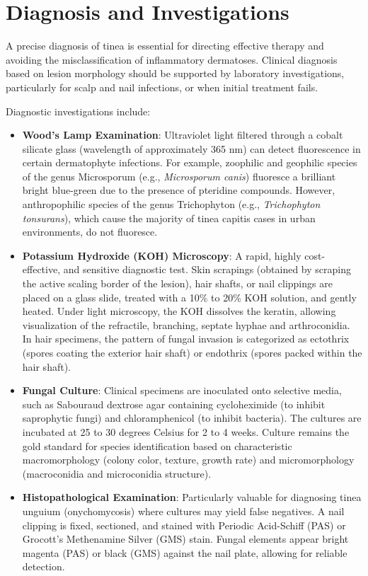 \section*{Diagnosis and Investigations}
A precise diagnosis of tinea is essential for directing effective therapy and avoiding the misclassification of inflammatory dermatoses. Clinical diagnosis based on lesion morphology should be supported by laboratory investigations, particularly for scalp and nail infections, or when initial treatment fails.

Diagnostic investigations include:
\begin{itemize}
    \item \textbf{Wood's Lamp Examination}: Ultraviolet light filtered through a cobalt silicate glass (wavelength of approximately 365 nm) can detect fluorescence in certain dermatophyte infections. For example, zoophilic and geophilic species of the genus Microsporum (e.g., \textit{Microsporum canis}) fluoresce a brilliant bright blue-green due to the presence of pteridine compounds. However, anthropophilic species of the genus Trichophyton (e.g., \textit{Trichophyton tonsurans}), which cause the majority of tinea capitis cases in urban environments, do not fluoresce.
    \item \textbf{Potassium Hydroxide (KOH) Microscopy}: A rapid, highly cost-effective, and sensitive diagnostic test. Skin scrapings (obtained by scraping the active scaling border of the lesion), hair shafts, or nail clippings are placed on a glass slide, treated with a 10\% to 20\% KOH solution, and gently heated. Under light microscopy, the KOH dissolves the keratin, allowing visualization of the refractile, branching, septate hyphae and arthroconidia. In hair specimens, the pattern of fungal invasion is categorized as ectothrix (spores coating the exterior hair shaft) or endothrix (spores packed within the hair shaft).
    \item \textbf{Fungal Culture}: Clinical specimens are inoculated onto selective media, such as Sabouraud dextrose agar containing cycloheximide (to inhibit saprophytic fungi) and chloramphenicol (to inhibit bacteria). The cultures are incubated at 25 to 30 degrees Celsius for 2 to 4 weeks. Culture remains the gold standard for species identification based on characteristic macromorphology (colony color, texture, growth rate) and micromorphology (macroconidia and microconidia structure).
    \item \textbf{Histopathological Examination}: Particularly valuable for diagnosing tinea unguium (onychomycosis) where cultures may yield false negatives. A nail clipping is fixed, sectioned, and stained with Periodic Acid-Schiff (PAS) or Grocott's Methenamine Silver (GMS) stain. Fungal elements appear bright magenta (PAS) or black (GMS) against the nail plate, allowing for reliable detection.

\end{itemize}
